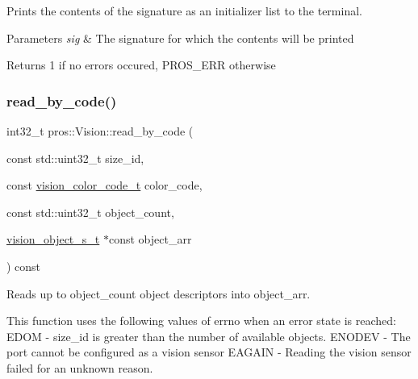 Prints the contents of the signature as an initializer list to the terminal. 


\begin{DoxyParams}{Parameters}
{\em sig} & The signature for which the contents will be printed\\
\hline
\end{DoxyParams}
\begin{DoxyReturn}{Returns}
1 if no errors occured, P\+R\+O\+S\+\_\+\+E\+RR otherwise 
\end{DoxyReturn}
\mbox{\label{classpros_1_1Vision_afbe909146f5cf396b322467885731d04}} 
\subsubsection{\texorpdfstring{read\+\_\+by\+\_\+code()}{read\_by\_code()}}
{\footnotesize\ttfamily int32\+\_\+t pros\+::\+Vision\+::read\+\_\+by\+\_\+code (\begin{DoxyParamCaption}\item[{const std\+::uint32\+\_\+t}]{size\+\_\+id,  }\item[{const \hyperlink{vision_8h_a71f2011a47e95558bb534b05c16c7f2b}{vision\+\_\+color\+\_\+code\+\_\+t}}]{color\+\_\+code,  }\item[{const std\+::uint32\+\_\+t}]{object\+\_\+count,  }\item[{\hyperlink{vision_8h_ae619120558539c13e53b5a6f42fb4375}{vision\+\_\+object\+\_\+s\+\_\+t} $\ast$const}]{object\+\_\+arr }\end{DoxyParamCaption}) const}



Reads up to object\+\_\+count object descriptors into object\+\_\+arr. 

This function uses the following values of errno when an error state is reached\+: E\+D\+OM -\/ size\+\_\+id is greater than the number of available objects. E\+N\+O\+D\+EV -\/ The port cannot be configured as a vision sensor E\+A\+G\+A\+IN -\/ Reading the vision sensor failed for an unknown reason.



